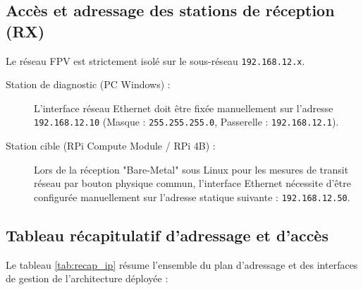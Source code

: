 \documentclass[a4paper,12pt]{article}
\begin{document}
\subsection{Accès et adressage des stations de réception (RX)}
Le réseau FPV est strictement isolé sur le sous-réseau \texttt{192.168.12.x}.
\begin{description}
    \item[Station de diagnostic (PC Windows) :] L'interface réseau Ethernet doit être fixée manuellement sur l'adresse \texttt{192.168.12.10} (Masque : \texttt{255.255.255.0}, Passerelle : \texttt{192.168.12.1}).
    \item[Station cible (RPi Compute Module / RPi 4B) :] Lors de la réception "Bare-Metal" sous Linux pour les mesures de transit réseau par bouton physique commun, l'interface Ethernet nécessite d'être configurée manuellement sur l'adresse statique suivante : \texttt{192.168.12.50}.
\end{description}

\subsection{Tableau récapitulatif d'adressage et d'accès}
Le tableau \ref{tab:recap_ip} résume l'ensemble du plan d'adressage et des interfaces de gestion de l'architecture déployée :
\end{document}
